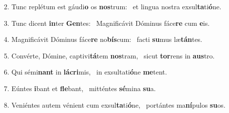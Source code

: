 2. Tunc replétum est gáudi\textbf{o} os \textbf{nos}trum: \ast\  et lingua nostra exsul\textbf{ta}ti\textbf{ó}ne.\

3. Tunc dicent \textbf{in}ter \textbf{Gen}tes: \ast\  Magnificávit Dóminus fáce\textbf{re} cum \textbf{e}is.\

4. Magnificávit Dóminus fáce\textbf{re} no\textbf{bís}cum: \ast\  facti \textbf{su}mus læ\textbf{tán}tes.\

5. Convérte, Dómine, captivi\textbf{tá}tem \textbf{nos}tram, \ast\  sicut \textbf{tor}rens in \textbf{aus}tro.\

6. Qui sémi\textbf{nant} in \textbf{lá}\textbf{cri}mis, \ast\  in exsultati\textbf{ó}ne \textbf{me}tent.\

7. Eúntes \textbf{i}bant et \textbf{fle}bant, \ast\  mitténtes \textbf{sé}mina \textbf{su}a.\

8. Veniéntes autem vénient cum exsul\textbf{ta}ti\textbf{ó}ne, \ast\  portántes ma\textbf{ní}pulos \textbf{su}os.\

